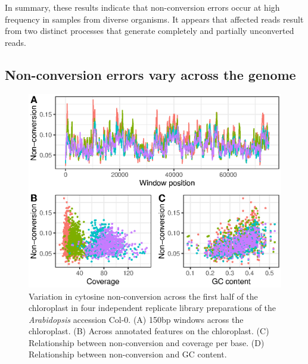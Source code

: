 \documentclass[12pt,longbibliography]{article}
\begin{document}
In summary, these results indicate that non-conversion errors occur at high frequency in samples from diverse organisms. It appears that affected reads result from two distinct processes that generate completely and partially unconverted reads.

\subsection{Non-conversion errors vary across the genome}

\begin{figure}
    \includegraphics{figure2.eps}
    \caption{
        Variation in cytosine non-conversion across the first half of the chloroplast in four independent replicate library preparations of the \textit{Arabidopsis} accession Col-0.
        (A) 150bp windows across the chloroplast.
        (B) Across annotated features on the chloroplast.
        (C) Relationship between non-conversion and coverage per base.
        (D) Relationship between non-conversion and GC content.
    }
    \label{fig:uncertainty}
\end{figure}
\end{document}
